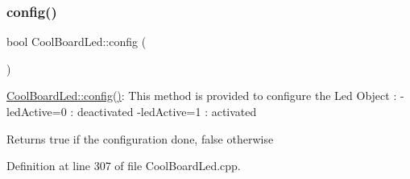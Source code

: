 \subsubsection{\texorpdfstring{config()}{config()}}
{\footnotesize\ttfamily bool Cool\+Board\+Led\+::config (\begin{DoxyParamCaption}{ }\end{DoxyParamCaption})}

\hyperlink{class_cool_board_led_a1b60e5e30bea96c49ed62ed1bf1ffc8b}{Cool\+Board\+Led\+::config()}\+: This method is provided to configure the Led Object \+: -\/led\+Active=0 \+: deactivated -\/led\+Active=1 \+: activated \begin{DoxyReturn}{Returns}
true if the configuration done, false otherwise 
\end{DoxyReturn}


Definition at line 307 of file Cool\+Board\+Led.\+cpp.


